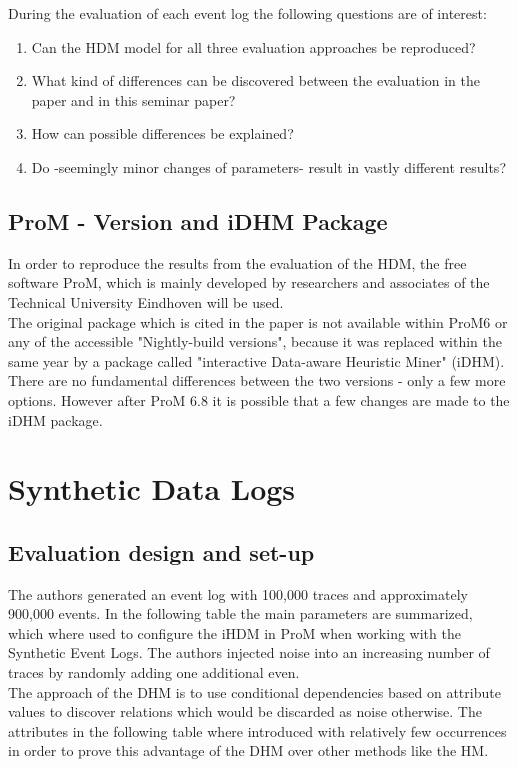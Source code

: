 During the evaluation of each event log the following questions are of interest:
\begin{enumerate}
\item Can the HDM model for all three evaluation approaches be reproduced?
\item What kind of differences can be discovered between the evaluation in the paper and in this seminar paper?
\item How can possible differences be explained?
\item Do -seemingly minor changes of parameters- result in vastly different results?
\end{enumerate}

\subsection{ProM - Version and iDHM Package}
In order to reproduce the results from the evaluation of the HDM, the free software ProM, which is mainly developed by researchers and associates of the Technical University Eindhoven will be used.\\
The original package which is cited in the paper is not available within ProM6 or any of the accessible "Nightly-build versions", because it was replaced within the same year by a package called "interactive Data-aware Heuristic Miner" (iDHM). There are no fundamental differences between the two versions - only a few more options. However after ProM 6.8 it is possible that a few changes are made to the iDHM package.\cite{Mannhardt2017}\\

\section{Synthetic Data Logs}

\subsection{Evaluation design and set-up}
The authors generated an event log with 100,000 traces and approximately 900,000 events.
In the following table the main parameters are summarized, which where used to configure the iHDM in ProM when working with the Synthetic Event Logs. The authors injected noise into an increasing number of traces by randomly adding one additional even.\\
The approach of the DHM is to use conditional dependencies based on attribute values to discover relations which would be discarded as noise otherwise. The attributes in the following table where introduced with relatively few occurrences in order to prove this advantage of the DHM over other methods like the HM.\\


